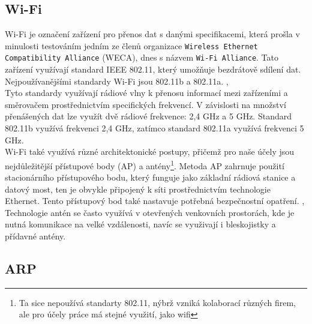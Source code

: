 \documentclass[12pt]{report}			%
\begin{document}
				\subsection{Wi-Fi}
				
				
Wi-Fi je označení zařízení pro přenos dat s danými specifikacemi, která prošla v minulosti testováním jedním ze členů organizace \texttt{Wireless Ethernet Compatibility Alliance} (WECA),  dnes s názvem \texttt{Wi-Fi Alliance}. Tato zařízení využívají standard IEEE 802.11, který umožňuje bezdrátově sdílení dat. Nejpoužívanějšími standardy Wi-Fi jsou 802.11b a 802.11a. \cite{WiFi1}, \cite{WiFi2}
\\
Tyto standardy využívají rádiové vlny k přenosu informací mezi zařízeními a směrovačem prostřednictvím specifických frekvencí. V závislosti na množství přenášených dat lze využít dvě rádiové frekvence: 2,4 GHz a 5 GHz. Standard 802.11b využívá frekvenci 2,4 GHz, zatímco standard 802.11a využívá frekvenci 5 GHz. \cite{WiFi1}
\\
Wi-Fi také využívá různé architektonické postupy, přičemž pro naše účely jsou nejdůležitější přístupové body (AP) a antény\footnote{Ta sice nepoužívá standarty 802.11, nýbrž vzniká kolaborací různých firem, ale pro účely práce má stejné využití, jako wifi}. Metoda AP zahrnuje použití stacionárního přístupového bodu, který funguje jako základní rádiová stanice a datový most, ten je obvykle připojený k síti prostřednictvím technologie Ethernet. Tento přístupový bod také nastavuje potřebná bezpečnostní opatření. \cite{WiFi1}, \cite{Pruvodce}
\\
Technologie antén se často využívá v otevřených venkovních prostorách, kde je nutná komunikace na velké vzdálenosti, navíc se využivají i bleskojistky a přídavné antény. \cite{Pruvodce}


				\subsection{ARP}
				
\end{document}
